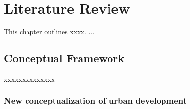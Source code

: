\documentclass[11pt]{report}
\begin{document}
\chapter{Literature Review}


This chapter outlines xxxx. ...

\section{Conceptual Framework}

xxxxxxxxxxxxxx

\subsection{New conceptualization of urban development}
\end{document}
